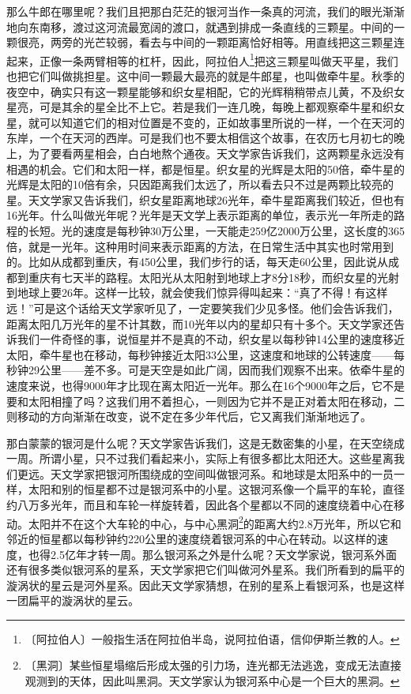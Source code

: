 \documentclass[12pt,UTF-8,openany]{ctexbook}
\begin{document}
\begin{normalsize}
    那么牛郎在哪里呢？我们且把那白茫茫的银河当作一条真的河流，我们的眼光渐渐地向东南移，渡过这河流最宽阔的渡口，就遇到排成一条直线的三颗星。中间的一颗很亮，两旁的光芒较弱，看去与中间的一颗距离恰好相等。用直线把这三颗星连起来，正像一条两臂相等的杠杆，因此，阿拉伯人\footnote{〔阿拉伯人〕一般指生活在阿拉伯半岛，说阿拉伯语，信仰伊斯兰教的人。}把这三颗星叫做天平星，我们也把它们叫做挑担星。这中间一颗最大最亮的就是牛郎星，也叫做牵牛星。秋季的夜空中，确实只有这一颗星能够和织女星相配，它的光辉稍稍带点儿黄，不及织女星亮，可是其余的星全比不上它。若是我们一连几晚，每晚上都观察牵牛星和织女星，就可以知道它们的相对位置是不变的，正如故事里所说的一样，一个在天河的东岸，一个在天河的西岸。可是我们也不要太相信这个故事，在农历七月初七的晚上，为了要看两星相会，白白地熬个通夜。天文学家告诉我们，这两颗星永远没有相遇的机会。它们和太阳一样，都是恒星。织女星的光辉是太阳的50倍，牵牛星的光辉是太阳的10倍有余，只因距离我们太远了，所以看去只不过是两颗比较亮的星。天文学家又告诉我们，织女星距离地球26光年，牵牛星距离我们较近，但也有16光年。什么叫做光年呢？光年是天文学上表示距离的单位，表示光一年所走的路程的长短。光的速度是每秒钟30万公里，一天能走259亿2000万公里，这长度的365倍，就是一光年。这种用时间来表示距离的方法，在日常生活中其实也时常用到的。比如从成都到重庆，有450公里，我们步行的话，每天走60公里，因此说从成都到重庆有七天半的路程。太阳光从太阳射到地球上才8分18秒，而织女星的光射到地球上要26年。这样一比较，就会使我们惊异得叫起来：“真了不得！有这样远！”可是这个话给天文学家听见了，一定要笑我们少见多怪。他们会告诉我们，距离太阳几万光年的星不计其数，而10光年以内的星却只有十多个。天文学家还告诉我们一件奇怪的事，说恒星并不是真的不动，织女星以每秒钟14公里的速度移近太阳，牵牛星也在移动，每秒钟接近太阳33公里，这速度和地球的公转速度——每秒钟29公里——差不多。可是天空是如此广阔，因而我们观察不出来。依牵牛星的速度来说，也得9000年才比现在离太阳近一光年。那么在16个9000年之后，它不是要和太阳相撞了吗？这我们用不着担心，一则因为它并不是正对着太阳在移动，二则移动的方向渐渐在改变，说不定在多少年代后，它又离我们渐渐地远了。
    
    那白蒙蒙的银河是什么呢？天文学家告诉我们，这是无数密集的小星，在天空绕成一周。所谓小星，只不过我们看起来小，实际上有很多都比太阳还大。这些星离我们更远。天文学家把银河所围绕成的空间叫做银河系。和地球是太阳系中的一员一样，太阳和别的恒星都不过是银河系中的小星。这银河系像一个扁平的车轮，直径约八万多光年，而且和车轮一样旋转着，因此各个星都以不同的速度绕着中心在移动。太阳并不在这个大车轮的中心，与中心黑洞\footnote{〔黑洞〕某些恒星塌缩后形成太强的引力场，连光都无法逃逸，变成无法直接观测到的天体，因此叫黑洞。天文学家认为银河系中心是一个巨大的黑洞。}的距离大约2.8万光年，所以它和邻近的恒星都以每秒钟约220公里的速度绕着银河系的中心在转动。以这样的速度，也得2.5亿年才转一周。那么银河系之外是什么呢？天文学家说，银河系外面还有很多类似银河系的星系，天文学家把它们叫做河外星系。我们所看到的扁平的漩涡状的星云是河外星系。因此天文学家猜想，在别的星系上看银河系，也是这样一团扁平的漩涡状的星云。
    

\end{normalsize}
\end{document}
